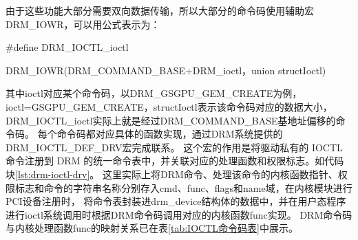 
由于这些功能大部分需要双向数据传输，所以大部分的命令码使用辅助宏DRM\_IOWR，可以用公式表示为：

\#define DRM\_IOCTL\_ioctl

 DRM\_IOWR(DRM\_COMMAND\_BASE+DRM\_ioctl，union structIoctl)

其中ioctl对应某个命令码，以DRM\_GSGPU\_GEM\_CREATE为例，ioctl=GSGPU\_GEM\_CREATE，structIoctl表示该命令码对应的数据大小，
DRM\_IOCTL\_ioctl实际上就是经过DRM\_COMMAND\_BASE基地址偏移的命令码。
每个命令码都对应具体的函数实现，通过DRM系统提供的DRM\_IOCTL\_DEF\_DRV宏完成联系。
这个宏的作用是将驱动私有的 IOCTL 命令注册到 DRM 的统一命令表中，并关联对应的处理函数和权限标志。如代码块\ref{lst:drm-ioctl-drv}。
这里实际上将DRM命令、处理该命令的内核函数指针、权限标志和命令的字符串名称分别存入cmd、func、flags和name域，在内核模块进行PCI设备注册时，
将命令表封装进drm\_device结构体的数据中，并在用户态程序进行ioctl系统调用时根据DRM命令码调用对应的内核函数func实现。
DRM命令码与内核处理函数func的映射关系已在表\ref{tab:IOCTL命令码表}中展示。


